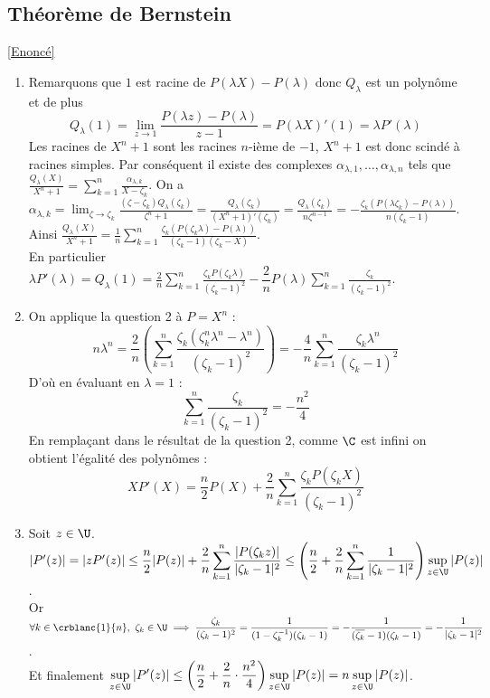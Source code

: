 \documentclass{book}
\begin{document}
	\subsection{Théorème de Bernstein }
	\label{sec:theoreme-de-bernstein}
	\textcolor{blue}{\hyperref[Théorème de Bernstein]{[Enoncé]}}\\
	\begin{enumerate}[leftmargin=*]
		\item Remarquons que $1$ est racine de $P(\lambda X)-P(\lambda)$ donc $Q_\lambda$ est un polynôme et de plus $$Q_\lambda(1)=\lim\limits_{z\to 1}\dfrac{P(\lambda z)-P(\lambda)}{z-1}=P(\lambda X)'(1)=\lambda P'(\lambda)$$
		Les racines de $X^n+1$ sont les racines $n$-ième de $-1$, $X^n+1$ est donc scindé à racines simples. Par conséquent il existe des complexes $\alpha_{\lambda,1},\dots,\alpha_{\lambda,n}$ tels que $\displaystyle\frac{Q_\lambda(X)}{X^n+1}=\sum_{k=1}^n\frac{\alpha_{\lambda,k}}{X-\zeta_k}$. On a $\alpha_{\lambda,k}=\displaystyle\lim_{\zeta\to\zeta_k}\frac{(\zeta-\zeta_k)Q_\lambda(\zeta_k)}{\zeta^n+1}=\frac{Q_\lambda(\zeta_k)}{(X^n+1)'(\zeta_k)}=\frac{Q_\lambda(\zeta_k)}{n\zeta^{n-1}}=-\frac{\zeta_k(P(\lambda\zeta_k)-P(\lambda))}{n(\zeta_k-1)}$.\\
		Ainsi $\displaystyle\frac{Q_\lambda(X)}{X^n+1}=\frac{1}{n}\sum_{k=1}^n\frac{\zeta_k(P(\zeta_k\lambda)-P(\lambda))}{(\zeta_k-1)(\zeta_k-X)}$.\\
		En particulier $\lambda P'(\lambda)=Q_\lambda(1)=\displaystyle\frac{2}{n}\sum_{k=1}^n\frac{\zeta_kP(\zeta_k\lambda)}{(\zeta_k-1)^2}-\dfrac{2}{n}P(\lambda)\sum_{k=1}^n\frac{\zeta_k}{(\zeta_k-1)^2}$.
		\item On applique la question 2 à $P=X^n$ :
		$$n\lambda^n=\frac{2}{n}\left(\sum_{k=1}^n\frac{\zeta_k(\zeta_k^n\lambda^n-\lambda^n)}{(\zeta_k-1)^2}\right)=-\frac{4}{n}\sum_{k=1}^n\frac{\zeta_k\lambda^n}{(\zeta_k-1)^2}$$
		D'où en évaluant en $\lambda=1$ :
		$$\sum_{k=1}^n\frac{\zeta_k}{(\zeta_k-1)^2}=-\frac{n^2}{4}$$
		En remplaçant dans le résultat de la question 2, comme $\C$ est infini on obtient l'égalité des polynômes :
		$$XP'(X)=\displaystyle\frac{n}{2}P(X)+\frac{2}{n}\sum_{k=1}^n\frac{\zeta_kP(\zeta_kX)}{(\zeta_k-1)^2}$$
		\item Soit $z\in \U$.\\
		$|P'(z)|=|zP'(z)|\leq \displaystyle\frac{n}{2}|P(z)|+\frac{2}{n}\sum_{k=1}^n\frac{|P(\zeta_kz)|}{|\zeta_k-1|^2}\leq \left(\frac{n}{2}+\frac{2}{n}\sum_{k=1}^n\frac{1}{|\zeta_k-1|^2}\right)\sup_{z\in \U}|P(z)|$.\\
		Or $\forall k\in \crblanc{1}{n},\ \zeta_k\in \U\implies \displaystyle\frac{\zeta_k}{(\zeta_k-1)^2}=\frac{1}{(1-\zeta_k^{-1})(\zeta_k-1)}=-\frac{1}{(\overline{\zeta_k}-1)(\zeta_k-1)}=-\frac{1}{|\zeta_k-1|^2}$.\\
		Et finalement $\displaystyle\sup_{z\in \U}|P'(z)|\leq \left(\frac{n}{2}+\frac{2}{n}\cdot\frac{n^2}{4}\right)\sup_{z\in \U}|P(z)|=n\sup_{z\in \U}|P(z)|$.
	\end{enumerate}
	
\end{document}
